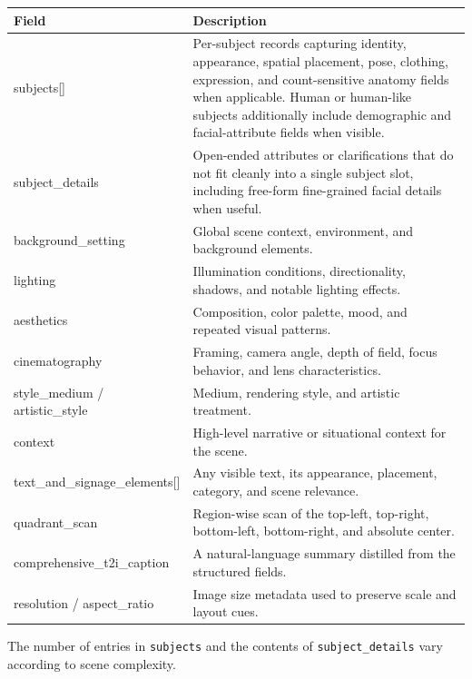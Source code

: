 \documentclass{llmxive}
\providecommand{\arraystretch}{1.5}
\begin{document}
\begin{tcolorbox}[
    colback=black!2,
    colframe=nvidiagreen!75!white,
    boxrule=0.4pt,
    arc=1pt,
    left=4pt,
    right=4pt,
    top=4pt,
    bottom=4pt,
    title=Top-level Fields in the Image Caption Schema
]
\small
\renewcommand{\arraystretch}{1.1}
\begin{tabularx}{\linewidth}{@{}>{\ttfamily}lX@{}}
\toprule
Field & Description \\
\midrule
subjects[] & Per-subject records capturing identity, appearance, spatial placement, pose, clothing, expression, and count-sensitive anatomy fields when applicable. Human or human-like subjects additionally include demographic and facial-attribute fields when visible. \\
subject\_details & Open-ended attributes or clarifications that do not fit cleanly into a single subject slot, including free-form fine-grained facial details when useful. \\
background\_setting & Global scene context, environment, and background elements. \\
lighting & Illumination conditions, directionality, shadows, and notable lighting effects. \\
aesthetics & Composition, color palette, mood, and repeated visual patterns. \\
cinematography & Framing, camera angle, depth of field, focus behavior, and lens characteristics. \\
style\_medium / artistic\_style & Medium, rendering style, and artistic treatment. \\
context & High-level narrative or situational context for the scene. \\
text\_and\_signage\_elements[] & Any visible text, its appearance, placement, category, and scene relevance. \\
quadrant\_scan & Region-wise scan of the top-left, top-right, bottom-left, bottom-right, and absolute center. \\
comprehensive\_t2i\_caption & A natural-language summary distilled from the structured fields. \\
resolution / aspect\_ratio & Image size metadata used to preserve scale and layout cues. \\
\bottomrule
\end{tabularx}
\end{tcolorbox}


The number of entries in \texttt{subjects} and the contents of \texttt{subject\_details} vary according to scene complexity.
\end{document}
